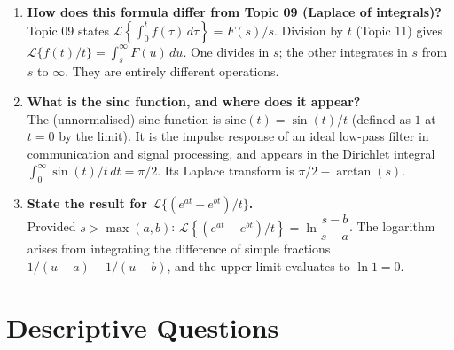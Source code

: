 \documentclass[12pt,a4paper]{article}
\begin{document}
\begin{enumerate}[leftmargin=2em, label=\textbf{Q\arabic*.}]
\item \textbf{How does this formula differ from Topic 09 (Laplace of integrals)?}\\
  Topic 09 states $\mathcal{L}\!\left\{\int_0^t f(\tau)\,d\tau\right\} = F(s)/s$.
  Division by $t$ (Topic 11) gives $\mathcal{L}\{f(t)/t\} = \int_s^\infty F(u)\,du$.
  One divides in $s$; the other integrates in $s$ from $s$ to $\infty$.
  They are entirely different operations.

\item \textbf{What is the sinc function, and where does it appear?}\\
  The (unnormalised) sinc function is $\text{sinc}(t)=\sin(t)/t$ (defined as
  $1$ at $t=0$ by the limit). It is the impulse response of an ideal low-pass
  filter in communication and signal processing, and appears in the
  Dirichlet integral $\int_0^\infty \sin(t)/t\,dt = \pi/2$. Its Laplace
  transform is $\pi/2 - \arctan(s)$.

\item \textbf{State the result for $\mathcal{L}\{(e^{at}-e^{bt})/t\}$.}\\
  Provided $s>\max(a,b)$:
  $\mathcal{L}\!\left\{(e^{at}-e^{bt})/t\right\} = \ln\dfrac{s-b}{s-a}$.
  The logarithm arises from integrating the difference of simple fractions
  $1/(u-a)-1/(u-b)$, and the upper limit evaluates to $\ln 1 = 0$.

\end{enumerate}

\section{Descriptive Questions}
\end{document}
